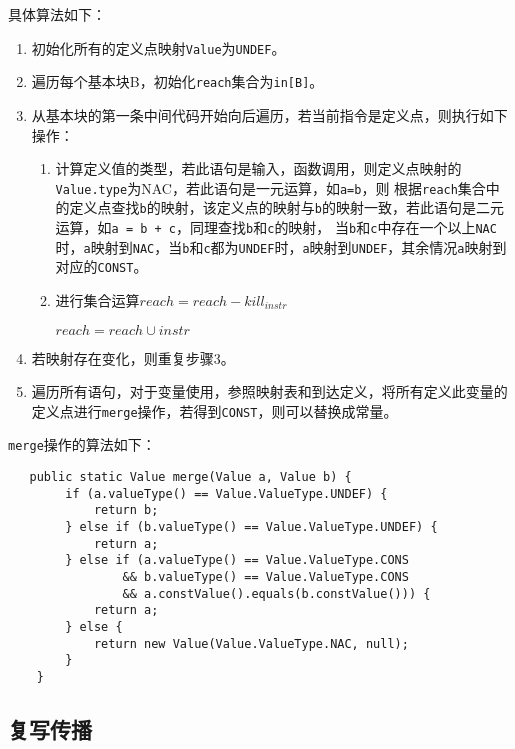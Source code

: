 具体算法如下：
\begin{enumerate}
    \item 初始化所有的定义点映射\texttt{Value}为\texttt{UNDEF}。
    \item 遍历每个基本块B，初始化\texttt{reach}集合为\texttt{in[B]}。
    \item 从基本块的第一条中间代码开始向后遍历，若当前指令是定义点，则执行如下操作：
             \begin{enumerate}
                \item 计算定义值的类型，若此语句是输入，函数调用，则定义点映射的\texttt{Value.type}为NAC，若此语句是一元运算，如\texttt{a=b}，则
                    根据\texttt{reach}集合中的定义点查找\texttt{b}的映射，该定义点的映射与\texttt{b}的映射一致，若此语句是二元运算，如\texttt{a = b + c}，同理查找\texttt{b}和\texttt{c}的映射，
                    当\texttt{b}和\texttt{c}中存在一个以上\texttt{NAC}时，\texttt{a}映射到\texttt{NAC}，当\texttt{b}和\texttt{c}都为\texttt{UNDEF}时，\texttt{a}映射到\texttt{UNDEF}，其余情况\texttt{a}映射到对应的\texttt{CONST}。
                \item 进行集合运算$reach = reach - kill_{instr}$ 
                
                                $reach = reach \cup {instr}$    
             \end{enumerate}
    \item 若映射存在变化，则重复步骤3。
    \item 遍历所有语句，对于变量使用，参照映射表和到达定义，将所有定义此变量的定义点进行\texttt{merge}操作，若得到\texttt{CONST}，则可以替换成常量。         
\end{enumerate}

\texttt{merge}操作的算法如下：

\begin{verbatim}
   public static Value merge(Value a, Value b) {
        if (a.valueType() == Value.ValueType.UNDEF) {
            return b;
        } else if (b.valueType() == Value.ValueType.UNDEF) {
            return a;
        } else if (a.valueType() == Value.ValueType.CONS
                && b.valueType() == Value.ValueType.CONS
                && a.constValue().equals(b.constValue())) {
            return a;
        } else {
            return new Value(Value.ValueType.NAC, null);
        }
    }
\end{verbatim}

\subsection{复写传播}

